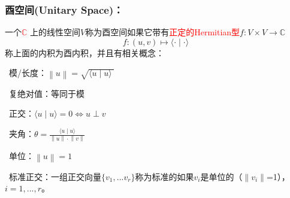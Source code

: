 \documentclass[zihao=5,UTF8]{report}
\theoremstyle{mystyle} %
\begin{document}
\subsubsection{酉空间(Unitary Space)：}
一个\textcolor{red}{$\mathbb{C}$} 上的线性空间$V$称为酉空间如果它带有\textcolor{red}{正定的Hermitian型}$f:V\times V \longrightarrow \mathbb{C}$
\begin{equation*}
    f: (u,v) \longmapsto \langle \cdot \mid \cdot \rangle 
\end{equation*}
称上面的内积为酉内积，并且有相关概念：\par
{}\ 模/长度：$\left \| u \right \|  = \sqrt{\langle u\mid u \rangle\ }$\par
{}\ 复绝对值：等同于模\par
{}\ 正交：$\langle u\mid u \rangle = 0 \Longleftrightarrow u \perp v$\par
{}\ 夹角：$\theta = \frac{\langle u\mid u \rangle}{ \left \| u \right \|\cdot  \left \| v \right \|}$ \par
{}\ 单位：$ \left \| u \right \|= 1$\par
{}\ 标准正交：一组正交向量$\{v_1,...v_r\}$称为标准的如果$v_i$是单位的（$\| v_i \|$=1），$i = 1,...,r$。
\end{document}

